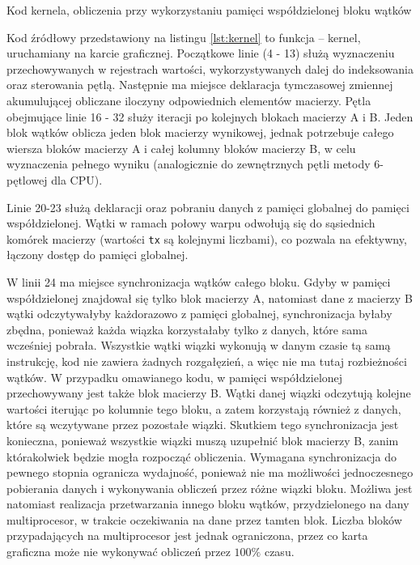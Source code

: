 \documentclass[12pt,a4paper]{article}
\begin{document}

\begin{listing}[ht!]
\inputminted{cuda}{listings/kernel.cu}
\caption{Kod kernela, obliczenia przy wykorzystaniu pamięci współdzielonej bloku wątków}
\label{lst:kernel}
\end{listing}

Kod źródłowy przedstawiony na listingu \ref{lst:kernel} to funkcja -- kernel, uruchamiany na karcie graficznej. Początkowe linie (4 - 13) służą wyznaczeniu przechowywanych w rejestrach wartości, wykorzystywanych dalej do indeksowania oraz sterowania pętlą. Następnie ma miejsce deklaracja tymczasowej zmiennej akumulującej obliczane iloczyny odpowiednich elementów macierzy. Pętla obejmujące linie 16 - 32 służy iteracji po kolejnych blokach macierzy A i B. Jeden blok wątków oblicza jeden blok macierzy wynikowej, jednak potrzebuje całego wiersza bloków macierzy A i całej kolumny bloków macierzy B, w celu wyznaczenia pełnego wyniku (analogicznie do zewnętrznych pętli metody 6-pętlowej dla CPU).

Linie 20-23 służą deklaracji oraz pobraniu danych z pamięci globalnej do pamięci współdzielonej. Wątki w ramach połowy warpu odwołują się do sąsiednich komórek macierzy (wartości \verb|tx| są kolejnymi liczbami), co pozwala na efektywny, łączony dostęp do pamięci globalnej.

W linii 24 ma miejsce synchronizacja wątków całego bloku. Gdyby w pamięci współdzielonej znajdował się tylko blok macierzy A, natomiast dane z macierzy B wątki odczytywałyby każdorazowo z pamięci globalnej, synchronizacja byłaby zbędna, ponieważ każda wiązka korzystałaby tylko z danych, które sama wcześniej pobrała. Wszystkie wątki wiązki wykonują w danym czasie tą samą instrukcję, kod nie zawiera żadnych rozgałęzień, a więc nie ma tutaj rozbieżności wątków. W przypadku omawianego kodu, w pamięci współdzielonej przechowywany jest także blok macierzy B.
Wątki danej wiązki odczytują kolejne wartości iterując po kolumnie tego bloku, a zatem korzystają również z danych, które są wczytywane przez pozostałe wiązki. Skutkiem tego synchronizacja jest konieczna, ponieważ wszystkie wiązki muszą uzupełnić blok macierzy B, zanim którakolwiek będzie mogła rozpocząć obliczenia. Wymagana synchronizacja do pewnego stopnia ogranicza wydajność, ponieważ nie ma możliwości jednoczesnego pobierania danych i wykonywania obliczeń przez różne wiązki bloku. Możliwa jest natomiast realizacja przetwarzania innego bloku wątków, przydzielonego na dany multiprocesor, w trakcie oczekiwania na dane przez tamten blok. Liczba bloków przypadających na multiprocesor jest jednak ograniczona, przez co karta graficzna może nie wykonywać obliczeń przez $100\%$ czasu.
\end{document}
